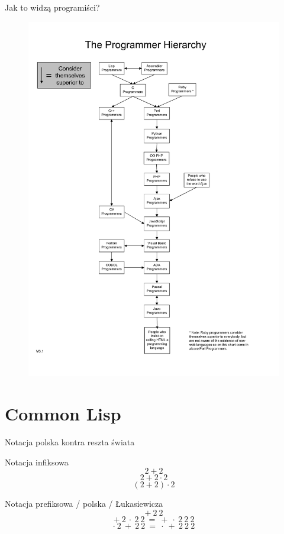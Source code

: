 \documentclass{beamer}
\begin{document}
\begin{frame}{Jak to widzą programiści?}
	\begin{figure}
		\includegraphics[scale=0.06]{guru}
	\end{figure}
\end{frame}

\section{Common Lisp}


\begin{frame}{Notacja polska kontra reszta świata}
	\begin{block}{Notacja infiksowa}
		\[2+2\]
		\[2+2\cdot 2\]
		\[(2+2)\cdot2\]
	\end{block}
	\pause
	\begin{block}{Notacja prefiksowa / polska / Łukasiewicza}
		\[+\ 2\ 2\]
		\[+\ 2\ \cdot \ 2\ 2\ =\ +\ \cdot\ 2\ 2\ 2\]
		\[\cdot\ 2\ +\ 2\ 2\ =\ \cdot\ +\ 2\ 2\ 2\]
	\end{block}
\end{frame}
\end{document}
